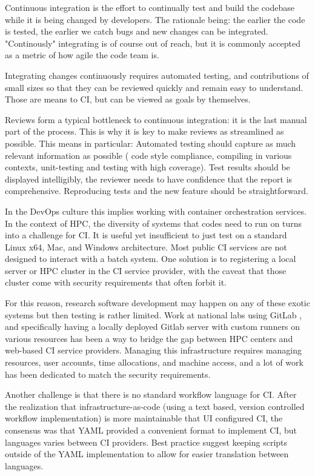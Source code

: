 Continuous integration is the effort to continually test and build the codebase
while it is being changed by developers. The rationale being: the earlier the
code is tested, the earlier we catch bugs and new changes can be integrated.
"Continously" integrating is of course out of reach, but it is commonly
accepted as a metric of how agile the code team is.

Integrating changes continuously requires automated testing, and contributions
of small sizes so that they can be reviewed quickly and remain easy to
understand. Those are means to CI, but can be viewed as goals by themselves.

Reviews form a typical bottleneck to continuous integration: it is the
last manual part of the process. This is why it is key to make reviews as
streamlined as possible. This means in particular: Automated testing should
capture as much relevant information as possible ( code style compliance,
compiling in various contexts, unit-testing and testing with high coverage).
Test results should be displayed intelligibly, the reviewer needs to have
confidence that the report is comprehensive. Reproducing tests and the new
feature should be straightforward.

In the DevOps culture this implies working with container orchestration
services. In the context of HPC, the diversity of systems that codes need to
run on turns into a challenge for CI. It is useful yet insufficient to just
test on a standard Linux x64, Mac, and Windows architecture. Most public CI
services are not designed to interact with a batch system. One solution is to
registering a local server or HPC cluster in the CI service provider, with the
caveat that those cluster come with security requirements that often forbit it.

For this reason, research software development may happen on any of these
exotic systems but then testing is rather limited. Work at national labs using
GitLab \cite{Mendoza_undated-lz,noauthor_undated-fv}, and specifically having a
locally deployed Gitlab server with custom runners on various resources
\cite{noauthor_undated-jd} has been a way to bridge the gap between HPC centers
and web-based CI service providers. Managing this infrastructure requires
managing resources, user accounts, time allocations, and machine access, and
a lot of work has been dedicated to match the security requirements.

Another challenge is that there is no standard workflow language for CI.
After the realization that infrastructure-as-code (using a text based, version
controlled workflow implementation) is more maintainable that UI configured CI,
the consensus was that YAML provided a convenient format to implement CI, but
languages varies between CI providers. Best practice suggest keeping scripts
outside of the YAML implementation to allow for easier translation between
languages.

